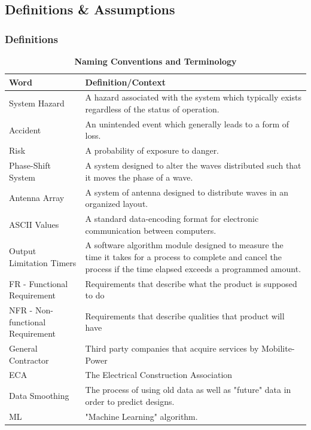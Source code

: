 \documentclass[12pt, titlepage]{article}
\begin{document}
\subsection{Definitions \& Assumptions}

\subsubsection{Definitions}
\begin{table}[H]
\caption{\bf Naming Conventions and Terminology}
\begin{tabular}{ |p{6cm}|p{8cm}|  } 
 \hline
\bf Word & \bf Definition/Context\\
 \hline
 System Hazard & A hazard associated with the system which typically exists regardless of the status of operation.\\
 \hline
 Accident & An unintended event  which generally leads to a form of loss.\\
 \hline
 Risk & A probability of exposure to danger.\\
 \hline
 Phase-Shift System & A system designed to alter the waves distributed such that it moves the phase of a wave.\\
 \hline
 Antenna Array & A system of antenna designed to distribute waves in an organized layout.\\
 \hline
 ASCII Values & A standard data-encoding format for electronic communication between computers.\\
 \hline
 Output Limitation Timers & A software algorithm module designed to measure the time it takes for a process to complete and cancel the process if the time elapsed exceeds a programmed amount.\\
 \hline
 FR - Functional Requirement & Requirements that describe what the product is supposed to do\\
 \hline
NFR - Non-functional Requirement & Requirements that describe qualities that product will have\\
 \hline
General Contractor & Third party companies that acquire services by Mobilite-Power\\
  \hline
ECA & The Electrical Construction Association\\
\hline
Data Smoothing & The process of using old data as well as "future" data in order to predict designs.\\
\hline
ML & "Machine Learning" algorithm.\\
\hline
\end{tabular}
\end{table}
\end{document}
